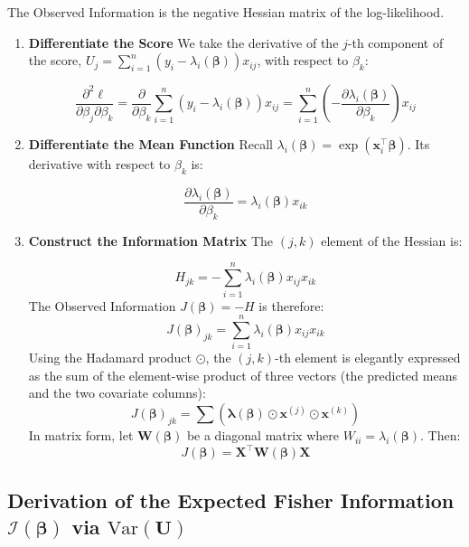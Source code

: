 \documentclass[
  letterpaper,
  DIV=11,
  numbers=noendperiod]{scrreprt}
\renewcommand{\[}{\begin{equation}}
\renewcommand{\]}{\end{equation}}
\theoremstyle{definition}
\theoremstyle{plain}
\theoremstyle{plain}
\theoremstyle{plain}
\theoremstyle{definition}
\theoremstyle{plain}
\theoremstyle{remark}
\begin{document}
The Observed Information is the negative Hessian matrix of the
log-likelihood.

\begin{enumerate}
\def\labelenumi{\arabic{enumi}.}
\item
  \textbf{Differentiate the Score} We take the derivative of the
  \(j\)-th component of the score,
  \(U_j = \sum_{i=1}^n (y_i - \lambda_i(\boldsymbol{\beta})) x_{ij}\),
  with respect to \(\beta_k\):

  \[
  \frac{\partial^2 \ell}{\partial \beta_j \partial \beta_k} = \frac{\partial}{\partial \beta_k} \sum_{i=1}^n (y_i - \lambda_i(\boldsymbol{\beta})) x_{ij} = \sum_{i=1}^n \left( -\frac{\partial \lambda_i(\boldsymbol{\beta})}{\partial \beta_k} \right) x_{ij}
  \]
\item
  \textbf{Differentiate the Mean Function} Recall
  \(\lambda_i(\boldsymbol{\beta}) = \exp(\mathbf{x}_i^\top \boldsymbol{\beta})\).
  Its derivative with respect to \(\beta_k\) is:

  \[
  \frac{\partial \lambda_i(\boldsymbol{\beta})}{\partial \beta_k} = \lambda_i(\boldsymbol{\beta}) x_{ik}
  \]
\item
  \textbf{Construct the Information Matrix} The \((j, k)\) element of
  the Hessian is:

  \[
  H_{jk} = -\sum_{i=1}^n \lambda_i(\boldsymbol{\beta}) x_{ij} x_{ik}
  \] The Observed Information \(J(\boldsymbol{\beta}) = -H\) is
  therefore: \[
  J(\boldsymbol{\beta})_{jk} = \sum_{i=1}^n \lambda_i(\boldsymbol{\beta}) x_{ij} x_{ik}
  \] Using the Hadamard product \(\odot\), the \((j,k)\)-th element is
  elegantly expressed as the sum of the element-wise product of three
  vectors (the predicted means and the two covariate columns): \[
  J(\boldsymbol{\beta})_{jk} = \sum \left( \boldsymbol{\lambda}(\boldsymbol{\beta}) \odot \mathbf{x}^{(j)} \odot \mathbf{x}^{(k)} \right)
  \] In matrix form, let \(\mathbf{W}(\boldsymbol{\beta})\) be a
  diagonal matrix where \(W_{ii} = \lambda_i(\boldsymbol{\beta})\).
  Then: \[
  J(\boldsymbol{\beta}) = \mathbf{X}^\top \mathbf{W}(\boldsymbol{\beta}) \mathbf{X}
  \]
\end{enumerate}

\subsection{\texorpdfstring{Derivation of the Expected Fisher
Information \(\mathcal{I}(\boldsymbol{\beta})\) via
\(\text{Var}(\mathbf{U})\)}{Derivation of the Expected Fisher Information \textbackslash mathcal\{I\}(\textbackslash boldsymbol\{\textbackslash beta\}) via \textbackslash text\{Var\}(\textbackslash mathbf\{U\})}}\label{derivation-of-the-expected-fisher-information-mathcaliboldsymbolbeta-via-textvarmathbfu}
\end{document}
